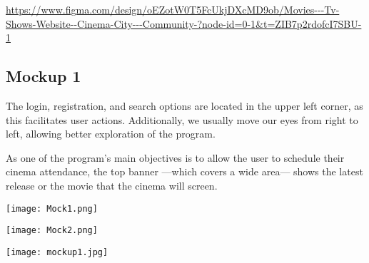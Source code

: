 \documentclass[12pt, letterpaper]{article}
\begin{document}
\url{https://www.figma.com/design/oEZotW0T5FcUkjDXcMD9ob/Movies---Tv-Shows-Website--Cinema-City---Community-?node-id=0-1&t=ZIB7p2rdofcI7SBU-1}
\newpage
\begin{center}
\begin{minipage}[t]{0.6\textwidth}
    \subsection*{Mockup 1}
    The login, registration, and search options are located in the upper left corner, as this facilitates user actions. Additionally, we usually move our eyes from right to left, allowing better exploration of the program.

    As one of the program’s main objectives is to allow the user to schedule their cinema attendance, the top banner —which covers a wide area— shows the latest release or the movie that the cinema will screen.

    \begin{center}
        \texttt{[image: Mock1.png]}
    \end{center}
    \vspace{1em}  
    \begin{center}
        \texttt{[image: Mock2.png]}
    \end{center}
\end{minipage}
\hfill
\begin{minipage}[t]{0.37\textwidth}    
    \vspace{1em}
    \begin{center}
        \texttt{[image: mockup1.jpg]}
    \end{center}
\end{minipage}
\end{center}
\end{document}
